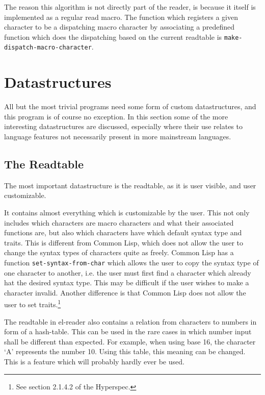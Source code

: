 \documentclass[a4paper,10pt,twoside]{report}
\newcommand{\cl}{Common Lisp}
\newcommand{\elr}{el-reader}
\newcommand{\fun}[1]{\texttt{#1}}
\begin{document}
The reason this algorithm is not directly part of the reader, is because it
itself is implemented as a regular read macro.  The function which registers a
given character to be a dispatching macro character by associating a predefined
function which does the dispatching based on the current readtable is
\fun{make-dispatch-macro-character}.


\section{Datastructures}
\label{sec:datastructures}

All but the most trivial programs need some form of custom datastructures, and
this program is of course no exception.  In this section some of the more
interesting datastructures are discussed, especially where their use relates to
language features not necessarily present in more mainstream languages.

\subsection{The Readtable}
\label{subsec:readtable-class}

The most important datastructure is the readtable, as it is user visible, and
user customizable.

It contains almost everything which is customizable by the user.  This not only
includes which characters are macro characters and what their associated
functions are, but also which characters have which default syntax type and
traits.  This is different from \cl{}, which does not allow the user to change
the syntax types of characters quite as freely.  \cl{} has a function
\fun{set-syntax-from-char} which allows the user to copy the syntax type of one
character to another, i.e. the user must first find a character which already
hat the desired syntax type.  This may be difficult if the user wishes to make a
character invalid.  Another difference is that \cl{} does not allow the user to
set traits.\footnote{See section 2.1.4.2 of the Hyperspec.}

The readtable in \elr{} also contains a relation from characters to numbers in
form of a hash-table.  This can be used in the rare cases in which number input
shall be different than expected.  For example, when using base 16, the
character `A' represents the number 10.  Using this table, this meaning can be
changed.  This is a feature which will probably hardly ever be used.
\end{document}
